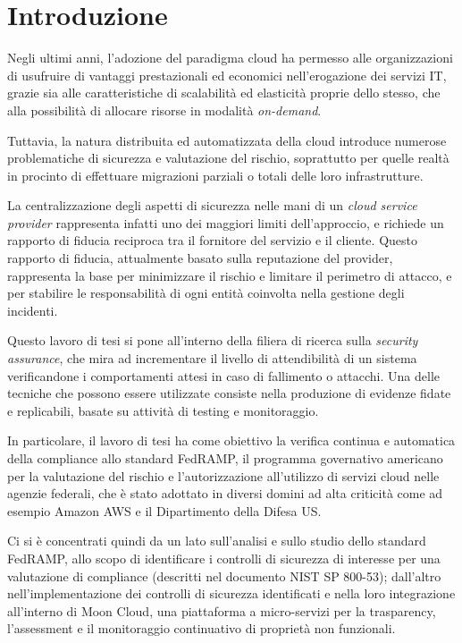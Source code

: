 \documentclass[../main.tex]{subfiles}
\begin{document}
\chapter*{Introduzione}

Negli ultimi anni, l'adozione del paradigma cloud ha permesso alle organizzazioni di usufruire di vantaggi prestazionali ed economici nell'erogazione dei servizi IT, grazie sia alle caratteristiche di scalabilità ed elasticità proprie dello stesso, che alla possibilità di allocare risorse in modalità \textit{on-demand}.


Tuttavia, la natura distribuita ed automatizzata della cloud introduce numerose problematiche di sicurezza e valutazione del rischio, soprattutto per quelle realtà in procinto di effettuare migrazioni parziali o totali delle loro infrastrutture.

La centralizzazione degli aspetti di sicurezza nelle mani di un \textit{cloud service provider} rappresenta infatti uno dei maggiori limiti dell'approccio, e richiede un rapporto di fiducia reciproca tra il fornitore del servizio e il cliente. Questo rapporto di fiducia, attualmente basato sulla reputazione del provider, rappresenta la base per minimizzare il rischio e limitare il perimetro di attacco, e per stabilire le responsabilità di ogni entità coinvolta nella gestione degli incidenti.


Questo lavoro di tesi si pone all'interno della filiera di ricerca sulla \textit{security assurance}, che mira ad incrementare il livello di attendibilità di un sistema verificandone i comportamenti attesi in caso di fallimento o attacchi.
Una delle tecniche che possono essere utilizzate consiste nella produzione di evidenze fidate e replicabili, basate su attività di testing e monitoraggio.


In particolare, il lavoro di tesi ha come obiettivo la verifica continua e automatica della compliance allo standard FedRAMP, il programma governativo americano per la valutazione del rischio e l'autorizzazione all'utilizzo di servizi cloud nelle agenzie federali, che è stato adottato in diversi domini ad alta criticità come ad esempio Amazon AWS e il Dipartimento della Difesa US.

Ci si è concentrati quindi da un lato sull'analisi e sullo studio dello standard FedRAMP, allo scopo di identificare i controlli di sicurezza di interesse per una valutazione di compliance (descritti nel documento NIST SP 800-53); dall'altro nell'implementazione dei controlli di sicurezza identificati e nella loro integrazione all'interno di Moon Cloud, una piattaforma a micro-servizi per la trasparency, l'assessment e il monitoraggio continuativo di proprietà non funzionali.
\end{document}
